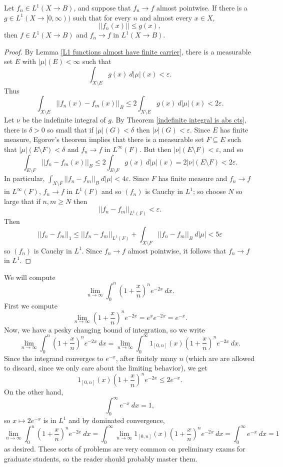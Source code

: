 \begin{theorem}
Let $f_{n} \in L^1(X \to B)$, and suppose that $f_{n} \to f$ almost pointwise. If there is a $g \in L^1(X \to [0, \infty))$ such that for every $n$ and almost every $x \in X$,
\[||f_{n}(x)|| \leq g(x),\]
then $f \in L^1(X \to B)$ and $f_{n} \to f$ in $L^1(X \to B)$.
\end{theorem}
\begin{proof}
By Lemma \ref{L1 functions almost have finite carrier}, there is a measurable set $E$ with $|\mu|(E) < \infty$ such that
\[\int_{X \setminus E} g(x) ~d|\mu|(x) < \varepsilon.\]
Thus
\[\int_{X \setminus E} ||f_{n}(x) - f_{m}(x)||_{B} \leq 2\int_{X \setminus E} g(x) ~d|\mu|(x) < 2\varepsilon.\]
Let $\nu$ be the indefinite integral of $g$.
By Theorem \ref{indefinite integral is abs cts}, there is $\delta > 0$ so small that if $|\mu|(G) < \delta$ then $|\nu|(G) < \varepsilon$.
Since $E$ has finite measure, Egorov's theorem implies that there is a measurable set $F \subseteq E$ such that $|\mu|(E \setminus F) < \delta$ and $f_{n} \to f$ in $L^\infty(F)$.
But then $|\nu|(E \setminus F) < \varepsilon$, and so
\[\int_{E \setminus F} ||f_{n} - f_{m}(x)||_{B} \leq 2\int_{E \setminus F} g(x) ~d|\mu|(x) = 2|\nu|(E \setminus F) < 2\varepsilon.\]
In particular, $\int_{X \setminus F} ||f_{n} - f_{m}||_{B} ~d|\mu| < 4\varepsilon$.
Since $F$ has finite measure and $f_{n} \to f$ in $L^\infty(F)$, $f_{n} \to f$ in $L^1(F)$ and so $(f_{n})$ is Cauchy in $L^1$; so choose $N$ so large that if $n,m \geq N$ then
\[||f_{n} - f_{m}||_{L^1(F)} < \varepsilon.\]
Then
\[||f_{n} - f_{m}||_1 \leq ||f_{n} - f_{m}||_{L^1(F)} + \int_{X \setminus F} ||f_{n} - f_{m}||_{B} ~d|\mu| < 5\varepsilon\]
so $(f_{n})$ is Cauchy in $L^1$.
Since $f_{n} \to f$ almost pointwise, it follows that $f_{n} \to f$ in $L^1$.
\end{proof}

\begin{example}
We will compute
\[\lim_{n \to \infty} \int_0^{n} \left(1 + \frac{x}{n}\right)^{n} e^{-2x} ~dx.\]
First we compute
\[\lim_{n \to \infty} \left(1 + \frac{x}{n}\right)^{n} e^{-2x} = e^{x} e^{-2x} = e^{-x}.\]
Now, we have a pesky changing bound of integration, so we write
\[\lim_{n \to \infty} \int_0^{n} \left(1 + \frac{x}{n}\right)^{n} e^{-2x} ~dx = \lim_{n \to \infty} \int_0^{\infty} 1_{[0, n]}(x) \left(1 + \frac{x}{n}\right)^{n} e^{-2x} ~dx.\]
Since the integrand converges to $e^{-x}$, after finitely many $n$ (which are are allowed to discard, since we only care about the limiting behavior), we get
\[1_{[0, n]}(x) \left(1 + \frac{x}{n}\right)^{n} e^{-2x} \leq 2e^{-x}.\]
On the other hand,
\[\int_0^{\infty} e^{-x} ~dx = 1,\]
so $x \mapsto 2e^{-x}$ is in $L^1$ and by dominated convergence,
\[\lim_{n \to \infty} \int_0^{n} \left(1 + \frac{x}{n}\right)^{n} e^{-2x} ~dx = \int_0^{\infty} \lim_{n \to \infty} 1_{[0, n]}(x) \left(1 + \frac{x}{n}\right)^{n} e^{-2x} ~dx = \int_0^{\infty} e^{-x} ~dx = 1\]
as desired.
These sorts of problems are very common on preliminary exams for graduate students, so the reader should probably master them.
\end{example}

